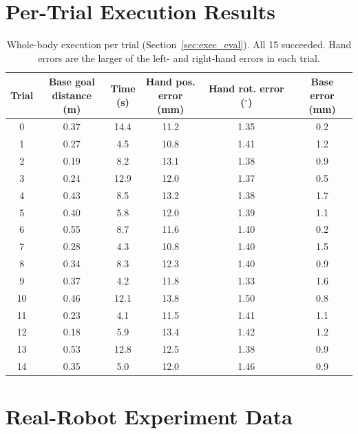 \section{Per-Trial Execution Results}
\label{app:exec_trials}

\begin{table}[H]
    \centering
    \small
    \begin{tabular}{cccccc}
        \toprule
        Trial & \shortstack{Base goal\\distance (m)} & \shortstack{Time\\(s)} & \shortstack{Hand pos.\\error (mm)} &
        \shortstack{Hand rot.\\error ($^\circ$)} & \shortstack{Base\\error (mm)} \\
        \midrule
        0 & 0.37 & 14.4 & 11.2 & 1.35 & 0.2 \\
        1 & 0.27 & 4.5 & 10.8 & 1.41 & 1.2 \\
        2 & 0.19 & 8.2 & 13.1 & 1.38 & 0.9 \\
        3 & 0.24 & 12.9 & 12.0 & 1.37 & 0.5 \\
        4 & 0.43 & 8.5 & 13.2 & 1.38 & 1.7 \\
        5 & 0.40 & 5.8 & 12.0 & 1.39 & 1.1 \\
        6 & 0.55 & 8.7 & 11.6 & 1.40 & 0.2 \\
        7 & 0.28 & 4.3 & 10.8 & 1.40 & 1.5 \\
        8 & 0.34 & 8.3 & 12.3 & 1.40 & 0.9 \\
        9 & 0.37 & 4.2 & 11.8 & 1.33 & 1.6 \\
        10 & 0.46 & 12.1 & 13.8 & 1.50 & 0.8 \\
        11 & 0.23 & 4.1 & 11.5 & 1.41 & 1.1 \\
        12 & 0.18 & 5.9 & 13.4 & 1.42 & 1.2 \\
        13 & 0.53 & 12.8 & 12.5 & 1.38 & 0.9 \\
        14 & 0.35 & 5.0 & 12.0 & 1.46 & 0.9 \\
        \bottomrule
    \end{tabular}
    \caption{\small{Whole-body execution per trial (Section~\ref{sec:exec_eval}). All 15 succeeded. Hand errors
    are the larger of the left- and right-hand errors in each trial.}}
    \label{tab:app_trials}
\end{table}

\section{Real-Robot Experiment Data}
\label{app:real}

\tbc
